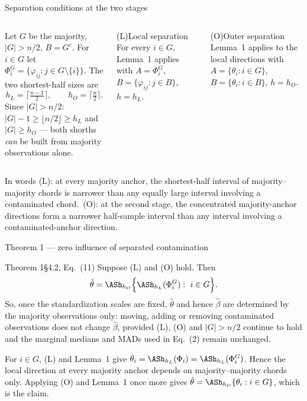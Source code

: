 \documentclass[aspectratio=169,9pt]{beamer}
\begin{document}
\begin{frame}{Separation conditions at the two stages}
\begin{columns}[T]
Let $G$ be the majority, $|G|>n/2$, $B=G^c$. For $i\in G$ let $\Phi_i^G=\{\varphi_{ij}:j\in G\setminus\{i\}\}$. The two shortest-half sizes are
\[h_L=\Big\lceil\tfrac{n-1}{2}\Big\rceil,\qquad h_O=\Big\lceil\tfrac n2\Big\rceil.\]
Since $|G|>n/2$: $|G|-1\ge\lfloor n/2\rfloor\ge h_L$ and $|G|\ge h_O$ --- both shorths \emph{can} be built from majority observations alone.
\begin{rthm}{(L)}{Local separation}{}
For every $i\in G$, Lemma~1 applies with $A=\Phi_i^G$, $B=\{\varphi_{ij}:j\in B\}$, $h=h_L$.
\end{rthm}
\begin{rthm}{(O)}{Outer separation}{}
Lemma~1 applies to the local directions with $A=\{\theta_i:i\in G\}$, $B=\{\theta_i:i\in B\}$, $h=h_O$.
\end{rthm}
\end{columns}
\vspace{2pt}
\begin{rkey}{In words}
(L): at every majority anchor, the shortest-half interval of majority--majority chords is narrower than any equally large interval involving a contaminated chord.\ (O): at the second stage, the concentrated majority-anchor directions form a narrower half-sample interval than any interval involving a contaminated-anchor direction.
\end{rkey}
\end{frame}

\begin{frame}{Theorem 1 --- zero influence of separated contamination}
\begin{rthm}{Theorem 1}{}{\S4.2, Eq.~(11)}
Suppose (L) and (O) hold. Then
\[\hat\theta=\ASh_{h_O}\Big\{\ASh_{h_L}(\Phi_i^G):\ i\in G\Big\}.\]
So, once the standardization scales are fixed, $\hat\theta$ and hence $\hat\beta$ are determined by the majority observations only: moving, adding or removing contaminated observations does not change $\hat\beta$, provided (L), (O) and $|G|>n/2$ continue to hold and the marginal medians and MADs used in Eq.~(2) remain unchanged.
\end{rthm}
\begin{rproof}
For $i\in G$, (L) and Lemma~1 give $\theta_i=\ASh_{h_L}(\Phi_i)=\ASh_{h_L}(\Phi_i^G)$. Hence the local direction at every majority anchor depends on majority--majority chords only. Applying (O) and Lemma~1 once more gives $\hat\theta=\ASh_{h_O}\{\theta_i:i\in G\}$, which is the claim.
\end{rproof}
\end{frame}
\end{document}
